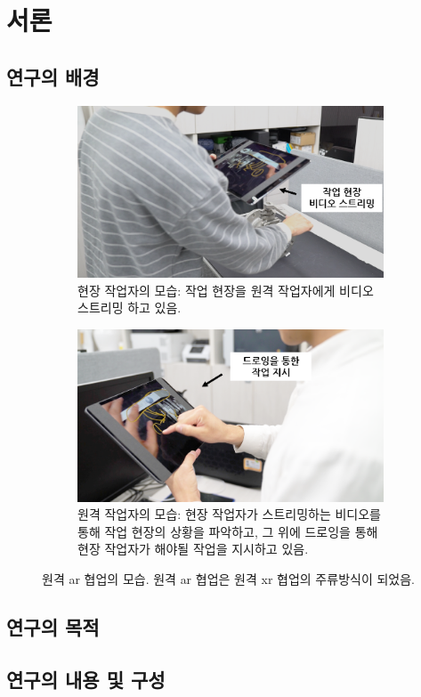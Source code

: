 
\section{서론}
\subsection{연구의 배경}

\begin{figure}[h!]
    \centering
    \begin{subfigure}[t]{0.95\textwidth}
        \centering
        \includegraphics[width=\textwidth]{figures/remote_ar_local_site.png}
        \caption{현장 작업자의 모습: 작업 현장을 원격 작업자에게 비디오 스트리밍 하고 있음.}
        \label{fig:remote_ar_local_site}
    \end{subfigure}
    
    \par\bigskip
        
    \begin{subfigure}[t]{0.95\textwidth}
        \centering
        \includegraphics[width=\textwidth]{figures/remote_ar_remote_site.png}
        \caption{원격 작업자의 모습: 현장 작업자가 스트리밍하는 비디오를 통해 작업 현장의 상황을 파악하고, 그 위에 드로잉을 통해 현장 작업자가 해야될 작업을 지시하고 있음.}
        \label{fig:remote_ar_remote_site}
    \end{subfigure}
    \caption{원격 \acrshort{ar} 협업의 모습. 원격 \acrshort{ar} 협업은 원격 \acrshort{xr} 협업의 주류방식이 되었음.}
    \label{fig:remote_ar_collaobration_example}
\end{figure}


\subsection{연구의 목적}

\subsection{연구의 내용 및 구성}